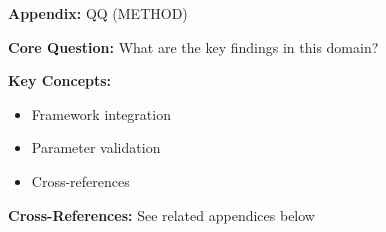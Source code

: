 \begin{tcolorbox}[colback=blue!5!white, colframe=blue!75!black,
    title=Quick Reference: Appendix QQ]

\textbf{Appendix:} QQ (METHOD)

\textbf{Core Question:} What are the key findings in this domain?

\textbf{Key Concepts:}
\begin{itemize}[nosep]
\item Framework integration
\item Parameter validation
\item Cross-references
\end{itemize}

\textbf{Cross-References:} See related appendices below
\end{tcolorbox}


\begin{abstract}
This appendix formalizes the segment-dimension multiplier $\sigma_s(I_c)$ that quantifies
how intervention effectiveness varies across behavioral segments. We establish
axioms for multiplier bounds, segment-dimension affinity, and reactance effects.
The complete $6 \times 8$ Segment-Dimension Affinity Matrix provides empirically-calibrated
$\sigma$ values derived from Fehr's heterogeneity research and meta-analytic
evidence. Note: The 10C dimensions are the primitives; interventions \textit{emerge}
from the continuous 10C space $[0,1]^9$ based on context analysis.
This enables precise targeting and avoidance of backfire effects.
\end{abstract}


